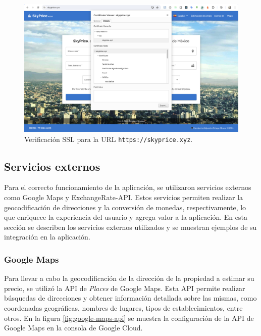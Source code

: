 \begin{figure}[H]
    \centering
    \includegraphics[width=1.0\textwidth]{imagenes/05-implementacion/despliegue/cloudfront-ssl.png}
    \caption{Verificación SSL para la URL \texttt{https://skyprice.xyz}.}
    \label{fig:skyprice-xyz-front}
\end{figure}

\subsection{Servicios externos}
Para el correcto funcionamiento de la aplicación, se utilizaron servicios externos
como Google Maps y ExchangeRate-API. Estos servicios permiten realizar la geocodificación
de direcciones y la conversión de monedas, respectivamente, lo que enriquece la
experiencia del usuario y agrega valor a la aplicación. En esta sección se describen
los servicios externos utilizados y se muestran ejemplos de su integración en la aplicación.

\subsubsection{Google Maps}
Para llevar a cabo la geocodificación de la dirección de la propiedad a estimar
su precio, se utilizó la API de \textit{Places} de Google Maps. Esta API permite
realizar búsquedas de direcciones y obtener información detallada sobre las mismas,
como coordenadas geográficas, nombres de lugares, tipos de establecimientos, entre
otros. En la figura \ref{fig:google-maps-api} se muestra la configuración de la
API de Google Maps en la consola de Google Cloud.

